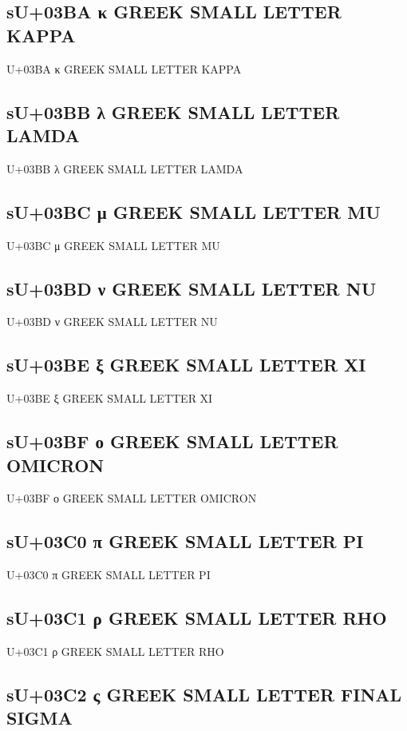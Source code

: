 \subsection{sU+03BA κ GREEK SMALL LETTER KAPPA}

U+03BA κ GREEK SMALL LETTER KAPPA

\subsection{sU+03BB λ GREEK SMALL LETTER LAMDA}

U+03BB λ GREEK SMALL LETTER LAMDA

\subsection{sU+03BC μ GREEK SMALL LETTER MU}

U+03BC μ GREEK SMALL LETTER MU

\subsection{sU+03BD ν GREEK SMALL LETTER NU}

U+03BD ν GREEK SMALL LETTER NU

\subsection{sU+03BE ξ GREEK SMALL LETTER XI}

U+03BE ξ GREEK SMALL LETTER XI

\subsection{sU+03BF ο GREEK SMALL LETTER OMICRON}

U+03BF ο GREEK SMALL LETTER OMICRON

\subsection{sU+03C0 π GREEK SMALL LETTER PI}

U+03C0 π GREEK SMALL LETTER PI

\subsection{sU+03C1 ρ GREEK SMALL LETTER RHO}

U+03C1 ρ GREEK SMALL LETTER RHO

\subsection{sU+03C2 ς GREEK SMALL LETTER FINAL SIGMA}

